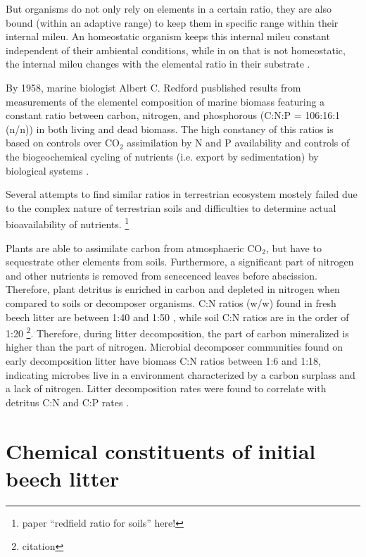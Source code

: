 But organisms do not only rely on elements in a certain ratio, they are also bound (within an adaptive range) to keep them in specific range within their internal mileu. An homeostatic organism keeps this internal mileu constant independent of their ambiental conditions, while in on that is not homeostatic, the internal mileu changes with the elemental ratio in their substrate \citep{Sterner2002}. 

By 1958, marine biologist Albert C. Redford pusblished results from measurements of the elementel composition of marine biomass featuring a constant ratio between carbon, nitrogen, and phosphorous (C:N:P = 106:16:1 (n/n)) in both living and dead biomass. The high constancy of this ratios is based on controls over CO$_2$ assimilation by N and P availability and controls of the  biogeochemical cycling of nutrients (i.e. export by sedimentation) by biological systems \citep{Cleveland2007}. 

Several attempts to find similar ratios in terrestrian ecosystem mostely failed due to the complex nature of terrestrian soils and difficulties to determine actual bioavailability of nutrients. \footnote{paper “redfield ratio for soils” here!}

Plants are able to assimilate carbon from atmosphaeric CO$_2$, but have to sequestrate other elements from soils. Furthermore, a significant part of nitrogen and other nutrients is removed from senecenced leaves before abscission. Therefore, plant detritus is enriched in carbon and depleted in nitrogen when compared to soils or decomposer organisms. C:N ratios (w/w) found in fresh beech litter are between 1:40 and 1:50 \citep{Mooshammer2011}, while soil C:N ratios are in the order of 1:20 \footnote{citation}. Therefore, during litter decomposition, the part of carbon mineralized is higher than the part of nitrogen. Microbial decomposer communities found on early decomposition litter have biomass C:N ratios between 1:6 and 1:18, indicating microbes live in a environment characterized by a carbon surplass and a lack of nitrogen. Litter decomposition rates were found to correlate with detritus C:N and C:P rates \citep{Enriquez1993}.

\section{Chemical constituents of initial beech litter}

